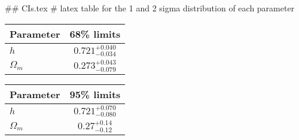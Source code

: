 ## CIs.tex
# latex table for the 1 and 2 sigma distribution of each parameter

\begin{tabular} { l  c}
 Parameter &  68\% limits\\
\hline
{\boldmath$h              $} & $0.721^{+0.040}_{-0.034}   $\\
{\boldmath$\Omega_m       $} & $0.273^{+0.043}_{-0.079}   $\\
\hline
\end{tabular}

\begin{tabular} { l  c}
 Parameter &  95\% limits\\
\hline
{\boldmath$h              $} & $0.721^{+0.070}_{-0.080}   $\\
{\boldmath$\Omega_m       $} & $0.27^{+0.14}_{-0.12}      $\\
\hline
\end{tabular}
